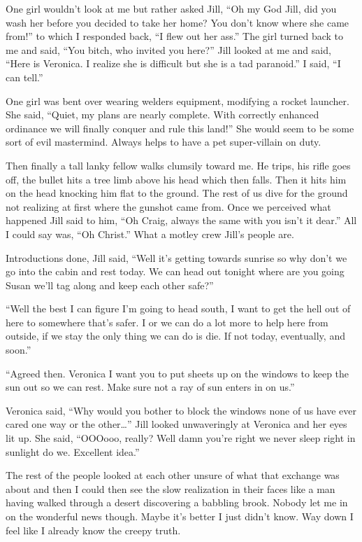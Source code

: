 One girl wouldn't look at me but rather asked Jill, ``Oh my God Jill, did you wash her before you decided to take her home? You don't know where she came from!'' to which I responded back, ``I flew out her ass.'' The girl turned back to me and said, ``You bitch, who invited you here?'' Jill looked at me and said, ``Here is Veronica. I realize she is difficult but she is a tad paranoid.'' I said, ``I can tell.''

One girl was bent over wearing welders equipment, modifying a rocket launcher. She said, ``Quiet, my plans are nearly complete. With correctly enhanced ordinance we will finally conquer and rule this land!'' She would seem to be some sort of evil mastermind. Always helps to have a pet super-villain on duty. 

Then finally a tall lanky fellow walks clumsily toward me. He trips, his rifle goes off, the bullet hits a tree limb above his head which then falls. Then it hits him on the head knocking him flat to the ground. The rest of us dive for the ground not realizing at first where the gunshot came from. Once we perceived what happened Jill said to him, ``Oh Craig, always the same with you isn't it dear.'' All I could say was, ``Oh Christ.'' What a motley crew Jill's people are.

Introductions done, Jill said, ``Well it's getting towards sunrise so why don't we go into the cabin and rest today. We can head out tonight where are you going Susan we'll tag along and keep each other safe?''

``Well the best I can figure I'm going to head south, I want to get the hell out of here to somewhere that's safer. I or we can do a lot more to help here from outside, if we stay the only thing we can do is die. If not today, eventually, and soon.''

``Agreed then. Veronica I want you to put sheets up on the windows to keep the sun out so we can rest. Make sure not a ray of sun enters in on us.''

Veronica said, ``Why would you bother to block the windows none of us have ever cared one way or the other\dots'' Jill looked unwaveringly at Veronica and her eyes lit up. She said, ``OOOooo, really? Well damn you're right we never sleep right in sunlight do we. Excellent idea.''

The rest of the people looked at each other unsure of what that exchange was about and then I could then see the slow realization in their faces like a man having walked through a desert discovering a babbling brook. Nobody let me in on the wonderful news though. Maybe it's better I just didn't know. Way down I feel like I already know the creepy truth.

